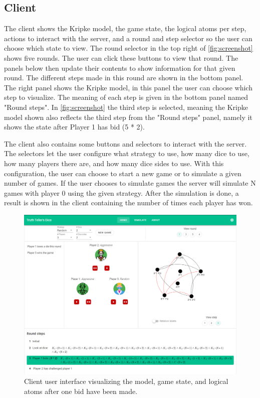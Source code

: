 \documentclass{article}
\begin{document}
\subsection*{Client}
The client shows the Kripke model, the game state, the logical atoms per step, actions to interact with the server, and a round and step selector so the user can choose which state to view. The round selector in the top right of \autoref{fig:screenshot} shows five rounds. The user can click these buttons to view that round. The panels below then update their contents to show information for that given round. The different steps made in this round are shown in the bottom panel. The right panel shows the Kripke model, in this panel the user can choose which step to visualize. The meaning of each step is given in the bottom panel named "Round steps". In \autoref{fig:screenshot} the third step is selected, meaning the Kripke model shown also reflects the third step from the "Round steps" panel, namely it shows the state after Player 1 has bid (5 * 2).

The client also contains some buttons and selectors to interact with the server. The selectors let the user configure what strategy to use, how many dice to use, how many players there are, and how many dice sides to use. With this configuration, the user can choose to start a new game or to simulate a given number of games. If the user chooses to simulate games the server will simulate N games with player 0 using the given strategy. After the simulation is done, a result is shown in the client containing the number of times each player has won. 

\begin{figure}[h]
    \includegraphics[width=\textwidth]{img/imgscreenshot.png}
    \centering
    \caption{Client user interface visualizing the model, game state, and logical atoms after one bid have been made.}
    \label{fig:screenshot}
\end{figure}
\end{document}
